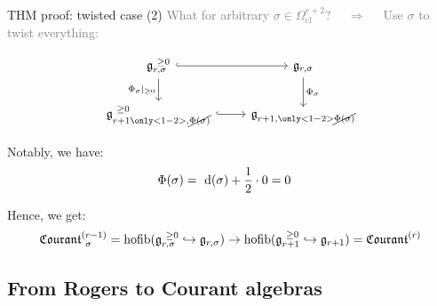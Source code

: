 \documentclass[beamer,10pt]{standalone}
\begin{document}
\begin{frame}{THM proof: twisted case (2)}
  \textcolor{gray}{ What for arbitrary $\sigma \in \Omega^{r+2}_{\mathrm{cl}}$? $\quad\Rightarrow \quad$
  Use $\sigma$ to twist everything:}
  \vfill

	\begin{displaymath}
		\begin{tikzcd}[ampersand replacement=\&]
			\g_{r,\sigma}^{~\geq 0} \ar[r,hook] \ar[d, "\Phi_\sigma \vert_{\geq 0}"']
			\& \g_{r,\sigma} \ar[d, "\Phi_\sigma"]
			\\
			\g_{r+1\only<1-2>{,\cancel{\Phi(\sigma)}}}^{~\geq 0} \ar[r,hook] \& \g_{r+1,\only<1-2>{\cancel{\Phi(\sigma)}}}
		\end{tikzcd}
	\end{displaymath}
	\vfill

	Notably, we have:
	\begin{align*}
		\Phi(\sigma) &=~  \d(\sigma) + \frac{1}{2}\cdot 0 = 0
	\end{align*}
	\vfill \pause

	Hence, we get:
	$$ \Courant[\sigma]{r-1} = \hofib(\g_{r,\sigma}^{~\geq 0} \hookrightarrow \g_{r,\sigma}) \to \hofib(\g_{r+1}^{~\geq 0} \hookrightarrow \g_{r+1}) = \Courant{r}$$

		\begin{flushright}
			\qedsymbol
		\end{flushright}

\end{frame}

\subsection{From Rogers to Courant algebras}
\end{document}

